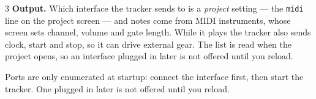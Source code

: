 \documentclass[8pt,a4paper]{extarticle}
\newcommand{\sq}[1]{\texttt{#1}}
\newcommand{\kw}[1]{\textbf{#1}}
\newcommand{\note}[1]{%
  \par\addvspace{1.2mm}%
  \noindent\colorbox{boxbg}{%
    \begin{minipage}{\dimexpr\linewidth-2\fboxsep\relax}%
      \scriptsize\color{ink}#1%
    \end{minipage}}%
  \par\addvspace{0.6mm}}
\begin{document}
\begin{multicols}{3}
\kw{Output.} Which interface the tracker sends to is a \emph{project} setting
--- the \sq{midi} line on the project screen --- and notes come from MIDI
instruments, whose screen sets channel, volume and gate length. While it plays
the tracker also sends clock, start and stop, so it can drive external gear.
The list is read when the project opens, so an interface plugged in later is
not offered until you reload.

\note{Ports are only enumerated at startup: connect the interface first, then
start the tracker. One plugged in later is not offered until you reload.}

\end{multicols}
\end{document}
